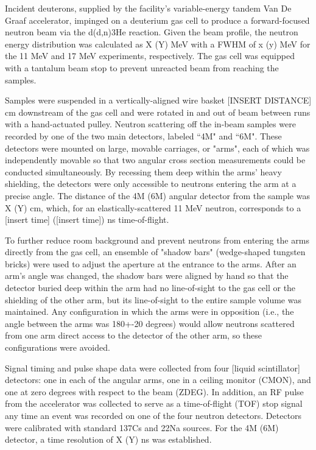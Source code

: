 Incident deuterons, supplied by the facility's variable-energy tandem
    Van De Graaf accelerator, impinged on a deuterium gas cell to produce a
forward-focused neutron beam via the d(d,n)3He reaction. Given the beam profile,
    the neutron energy distribution was calculated as X (Y) MeV with a FWHM of x (y)
    MeV for the 11 MeV and 17 MeV experiments, respectively. The gas cell was
    equipped with a tantalum beam stop to prevent unreacted beam from reaching
    the samples. 

    Samples were suspended in a vertically-aligned wire basket [INSERT DISTANCE] cm
    downstream of the gas cell and were rotated in and out of beam between
    runs with a hand-actuated pulley. Neutron scattering off
    the in-beam samples were recorded by one of the two main detectors, labeled ``4M"
    and ``6M". These detectors were mounted on large, movable carriages, or "arms",
    each of which was independently movable so that two angular cross section
    measurements could be conducted simultaneously. By recessing them deep within
    the arms' heavy shielding, the detectors were only accessible to neutrons
    entering the arm at a precise angle. The distance of the 4M (6M) angular
    detector from the sample was X (Y) cm, which, for an elastically-scattered
    11 MeV neutron, corresponds to a [insert time] ([insert time]) ns time-of-flight.

    To further reduce room background and prevent neutrons from entering the arms directly
    from the gas cell, an ensemble of "shadow bars" (wedge-shaped tungsten bricks)
    were used to adjust the aperture at the entrance to the arms. After an arm's
    angle was changed, the shadow bars were aligned by hand so that the
    detector buried deep within the arm had no line-of-sight to the gas cell or the
    shielding of the other arm, but its line-of-sight to the entire sample volume was
    maintained. Any configuration in which the arms were in opposition (i.e., the
    angle between the arms was 180+-20 degrees) would allow neutrons scattered
    from one arm direct access to the detector of the other arm, so these
    configurations were avoided.

    Signal timing and pulse shape data were collected from four [liquid scintillator]
    detectors: one in each of the angular arms, one in a ceiling monitor
    (CMON), and one at zero degrees with respect to the beam (ZDEG). In addition,
    an RF pulse from the accelerator was collected to serve as a time-of-flight
    (TOF) stop signal any time an event was recorded on one of the four neutron
    detectors. Detectors were calibrated with standard 137Cs and 22Na sources. For
    the 4M (6M) detector, a time resolution of X (Y) ns was established.
